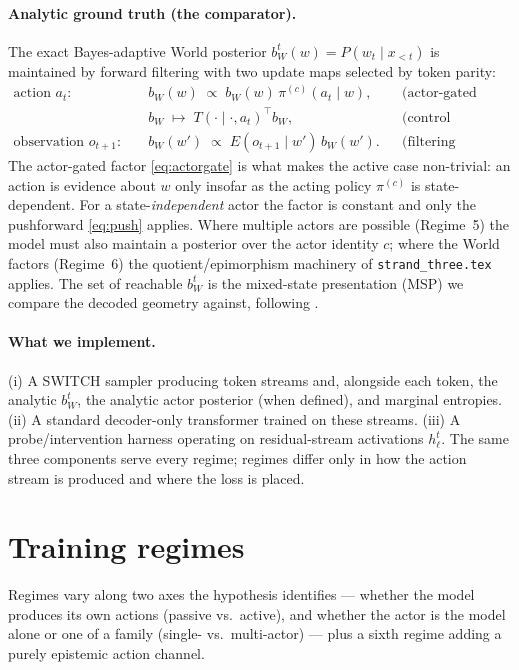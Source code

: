 \documentclass[11pt]{article}
\begin{document}
\paragraph{Analytic ground truth (the comparator).} The exact Bayes-adaptive
World posterior $b_W^t(w)=P(w_t\mid x_{<t})$ is maintained by forward filtering
with two update maps selected by token parity:
\begin{align}
  \text{action } a_t:\quad
    & b_W(w)\;\propto\; b_W(w)\,\pi^{(c)}(a_t\mid w),
      &&\text{(actor-gated likelihood)} \label{eq:actorgate}\\
    & b_W \;\mapsto\; T(\cdot\mid\cdot,a_t)^{\top} b_W,
      &&\text{(control pushforward)} \label{eq:push}\\
  \text{observation } o_{t+1}:\quad
    & b_W(w')\;\propto\; E(o_{t+1}\mid w')\,b_W(w').
      &&\text{(filtering update)} \label{eq:filter}
\end{align}
The actor-gated factor \eqref{eq:actorgate} is what makes the active case
non-trivial: an action is evidence about $w$ only insofar as the acting policy
$\pi^{(c)}$ is state-dependent. For a state-\emph{independent} actor the factor
is constant and only the pushforward \eqref{eq:push} applies. Where multiple
actors are possible (Regime~5) the model must also maintain a posterior over the
actor identity $c$; where the World factors (Regime~6) the quotient/epimorphism
machinery of \texttt{strand\_three.tex} applies. The set of reachable $b_W^t$ is
the mixed-state presentation (MSP) we compare the decoded geometry against,
following \citep{shai2024belief}.

\paragraph{What we implement.} (i) A SWITCH sampler producing token streams and,
alongside each token, the analytic $b_W^t$, the analytic actor posterior (when
defined), and marginal entropies. (ii) A standard decoder-only transformer
trained on these streams. (iii) A probe/intervention harness operating on
residual-stream activations $h_\ell^t$. The same three components serve every
regime; regimes differ only in how the action stream is produced and where the
loss is placed.

\section{Training regimes}
\label{sec:regimes}

Regimes vary along two axes the hypothesis identifies --- whether the model
produces its own actions (passive vs.\ active), and whether the actor is the
model alone or one of a family (single- vs.\ multi-actor) --- plus a sixth
regime adding a purely epistemic action channel.
\end{document}
